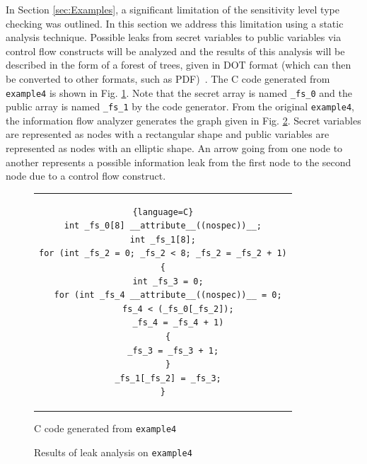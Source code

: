 \documentclass[10pt, conference]{IEEEtran}
\newcommand{\ttt}{\texttt}
\begin{document}
In Section \ref{sec:Examples}, a significant limitation of the sensitivity level type checking
was outlined. In this section we address this limitation using a static analysis technique.
Possible leaks from secret variables to public variables via control flow constructs will
be analyzed and the results of this analysis will be described in the form of
a forest of trees, given in DOT format (which can then be converted to other formats,
such as PDF)~\cite{DOT}. The C code generated from \ttt{example4} is shown in Fig. \ref{fig:GenC4}.
Note that the secret array is named \verb|_fs_0| and the public array is named \verb|_fs_1| by the
code generator. From the original \ttt{example4}, the information flow analyzer generates the
graph given in Fig. \ref{fig:Analysis4}. Secret variables are represented as nodes with
a rectangular shape and public variables are represented as nodes with an elliptic shape. An
arrow going from one node to another represents a possible information leak from the first
node to the second node due to a control flow construct.

\begin{figure}
\begin{center}
\begin{tabular}{c}
\begin{lstlisting}{language=C}
int _fs_0[8] __attribute__((nospec))__;
int _fs_1[8];
for (int _fs_2 = 0; _fs_2 < 8; _fs_2 = _fs_2 + 1)
{
  int _fs_3 = 0;
  for (int _fs_4 __attribute__((nospec))__ = 0;
      fs_4 < (_fs_0[_fs_2]);
      _fs_4 = _fs_4 + 1)
  {
    _fs_3 = _fs_3 + 1;
  }
  _fs_1[_fs_2] = _fs_3;
}
\end{lstlisting}
\end{tabular}
\end{center}
\caption{C code generated from \ttt{example4}}
\label{fig:GenC4}
\end{figure}

\begin{figure}
\centering
\caption{Results of leak analysis on \ttt{example4}}
\label{fig:Analysis4}
\end{figure}
\end{document}
